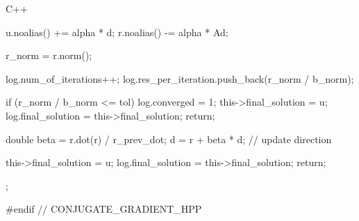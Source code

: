 \begin{codeblock}{C++}
{{{            u.noalias() += alpha * d;
            r.noalias() -= alpha * Ad;

            r_norm = r.norm();
            
            log.num_of_iterations++;
            log.res_per_iteration.push_back(r_norm / b_norm);

            if (r_norm / b_norm <= tol) 
            {   
                log.converged        = 1;
                this->final_solution = u;
                log.final_solution   = this->final_solution;
                return;
            }

            double beta = r.dot(r) / r_prev_dot;
            d           = r + beta * d; // update direction
        }
        this->final_solution = u;
        log.final_solution   = this->final_solution;
        return;
    }
};


#endif // CONJUGATE_GRADIENT_HPP
\end{codeblock}